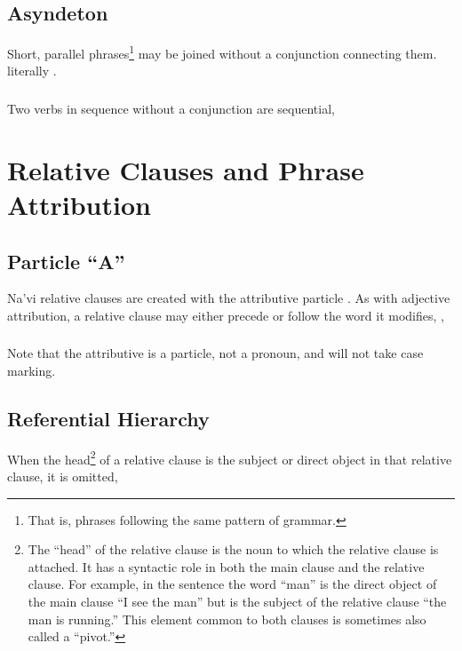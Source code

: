 \subsection{Asyndeton} Short, parallel phrases\footnote{That is,
phrases following the same pattern of grammar.} may be joined
without a conjunction connecting them.    literally
 
  .

\subsubsection{} Two verbs in sequence without a conjunction are
sequential,  


\section{Relative Clauses and Phrase Attribution}
\subsection{Particle ``A''} Na'vi relative clauses are created with
the attributive particle .\label{syn:a} As
with adjective attribution, a relative clause may either precede or
follow the word it modifies,  ,
 

\subsubsection{} Note that the attributive  is a particle, not a
pronoun, and will not take case marking.

\subsection{Referential Hierarchy} When the head\footnote{The ``head''
of the relative clause is the noun to which the relative clause is
attached.  It has a syntactic role in both the main clause and the
relative clause.  For example, in the sentence  the word ``man'' is the direct object of the main clause ``I
see the man'' but is the subject of the relative clause ``the man is
running.''  This element common to both clauses is sometimes also
called a ``pivot.''} of a relative clause is the subject or direct
object in that relative clause, it is omitted,

